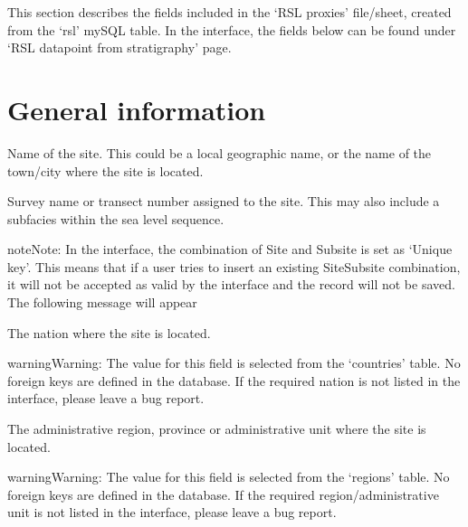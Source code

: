 \documentclass[letterpaper,10pt,english]{sphinxmanual}
\begin{document}
This section describes the fields included in the ‘RSL proxies’ file/sheet, created from the ‘rsl’ mySQL table. In the interface, the fields below can be found under ‘RSL datapoint from stratigraphy’ page.


\section{General information}
\label{\detokenize{RSL_data:general-information}}
 \sphinxhyphen{} Name of the site. This could be a local geographic name, or the name of the town/city where the site is located.

 \sphinxhyphen{} Survey name or transect number assigned to the site. This may also include a sub\sphinxhyphen{}facies within the sea level sequence.

\begin{sphinxadmonition}{note}{Note:}
In the interface, the combination of Site and Subsite is set as ‘Unique key’. This means that if a user tries to insert an existing Site\sphinxhyphen{}Subsite combination, it will not be accepted as valid by the interface and the record will not be saved. The following message will appear

\end{sphinxadmonition}

 \sphinxhyphen{} The nation where the site is located.

\begin{sphinxadmonition}{warning}{Warning:}
The value for this field is selected from the ‘countries’ table. No foreign keys are defined in the database. If the required nation is not listed in the interface, please leave a bug report.
\end{sphinxadmonition}

 \sphinxhyphen{} The administrative region, province or administrative unit where the site is located.

\begin{sphinxadmonition}{warning}{Warning:}
The value for this field is selected from the ‘regions’ table. No foreign keys are defined in the database. If the required region/administrative unit is not listed in the interface, please leave a bug report.
\end{sphinxadmonition}
\end{document}
